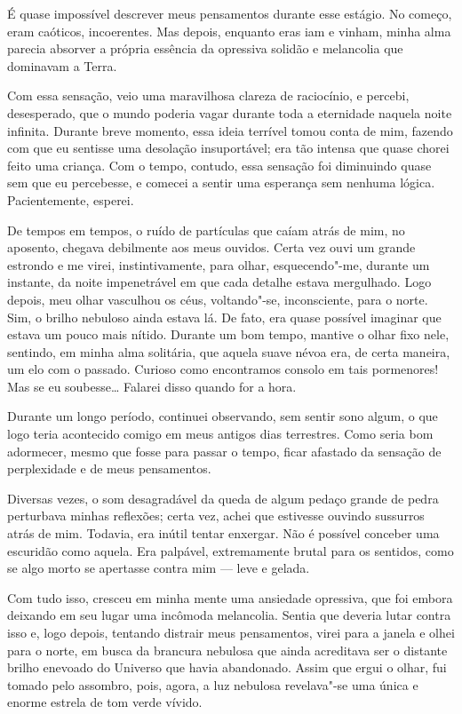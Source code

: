 É quase impossível descrever meus pensamentos durante esse estágio. No começo, eram caóticos, incoerentes. Mas depois,
enquanto eras iam e vinham, minha alma parecia absorver a própria essência da opressiva solidão e melancolia que
dominavam a Terra. 

Com essa sensação, veio uma maravilhosa clareza de raciocínio, e percebi, desesperado, que o mundo poderia vagar
durante toda a eternidade naquela noite infinita. Durante breve momento, essa ideia terrível tomou conta de mim,
fazendo com que eu sentisse uma desolação insuportável; era tão intensa que quase chorei feito uma criança. Com o
tempo, contudo, essa sensação foi diminuindo quase sem que eu percebesse, e comecei a sentir uma esperança sem nenhuma
lógica. Pacientemente, esperei.

De tempos em tempos, o ruído de partículas que caíam atrás de mim, no aposento, chegava debilmente aos meus ouvidos.
Certa vez ouvi um grande estrondo e me virei, instintivamente, para olhar, esquecendo"-me, durante um instante, da noite
impenetrável em que cada detalhe estava mergulhado. Logo depois, meu olhar vasculhou os céus, voltando"-se,
inconsciente, para o norte. Sim, o brilho nebuloso ainda estava lá. De fato, era quase possível imaginar que estava
um pouco mais nítido. Durante um bom tempo, mantive o olhar fixo nele, sentindo, em minha alma solitária, que aquela
suave névoa era, de certa maneira, um elo com o passado. Curioso como encontramos consolo em tais pormenores! Mas se eu
soubesse\ldots{} Falarei disso quando for a hora.

Durante um longo período, continuei observando, sem sentir sono algum, o que logo teria acontecido comigo em meus
antigos dias terrestres. Como seria bom adormecer, mesmo que fosse para passar o tempo, ficar afastado da sensação de
perplexidade e de meus pensamentos.

Diversas vezes, o som desagradável da queda de algum pedaço grande de pedra perturbava minhas reflexões; certa vez,
achei que estivesse ouvindo sussurros atrás de mim. Todavia, era inútil tentar enxergar. Não é possível
conceber uma escuridão como aquela. Era palpável, extremamente brutal para os sentidos, como se algo morto se apertasse
contra mim --- leve e gelada.

Com tudo isso, cresceu em minha mente uma ansiedade opressiva, que foi embora deixando em seu lugar uma incômoda
melancolia. Sentia que deveria lutar contra isso e, logo depois, tentando distrair meus pensamentos, virei para a
janela e olhei para o norte, em busca da brancura nebulosa que ainda acreditava ser o distante brilho enevoado do
Universo que havia abandonado. Assim que ergui o olhar, fui tomado pelo assombro, pois, agora, a luz nebulosa
revelava"-se uma única e enorme estrela de tom verde vívido.

